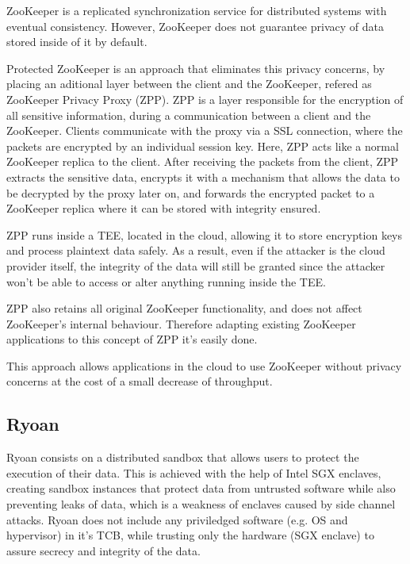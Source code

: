 ZooKeeper \cite{zookeeper} is a replicated synchronization service for distributed systems with eventual consistency. However, ZooKeeper does not guarantee privacy of data stored inside of it by default.

Protected ZooKeeper \cite{protectedZooKeeper} is an approach that eliminates this privacy concerns, by placing an aditional layer between the client and the ZooKeeper, refered as ZooKeeper Privacy Proxy (ZPP). ZPP is a layer responsible for the encryption of all sensitive information, during a communication between a client and the ZooKeeper. 
Clients communicate with the proxy via a SSL connection, where the packets are encrypted by an individual session key. Here, ZPP acts like a normal ZooKeeper replica to the client. 
After receiving the packets from the client, ZPP extracts the sensitive data, encrypts it with a mechanism that allows the data to be decrypted by the proxy later on, and forwards the encrypted packet to a ZooKeeper replica where it can be stored with integrity ensured.

ZPP runs inside a TEE, located in the cloud, allowing it to store encryption keys and process plaintext data safely. As a result, even if the attacker is the cloud provider itself, the integrity of the data will still be granted since the attacker won't be able to access or alter anything running inside the TEE.

ZPP also retains all original ZooKeeper functionality, and does not affect ZooKeeper's internal behaviour. Therefore adapting existing ZooKeeper applications to this concept of ZPP it's easily done.

This approach allows applications in the cloud to use ZooKeeper without privacy concerns at the cost of a small decrease of throughput.
\subsection{Ryoan}
\label{ssec:ryoan_sandboxing}

Ryoan \cite{ryoanPaper} consists on a distributed sandbox that allows users to protect the execution of their data. This is achieved with the help of Intel SGX \cite{intelSGX} \cite{sgxPaper} enclaves, creating sandbox instances that protect data from untrusted software while also preventing leaks of data, which is a weakness of enclaves caused by side channel attacks.
Ryoan does not include any priviledged software (e.g. OS and hypervisor) in it's TCB, while trusting only the hardware (SGX enclave) to assure secrecy and integrity of the data.

